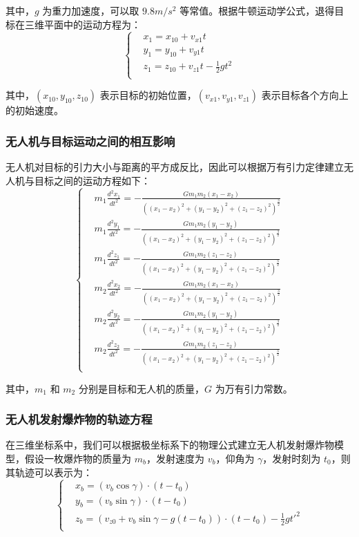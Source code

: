 \documentclass[normalsize]{ctexart}
\begin{document}
		其中，$g$ 为重力加速度，可以取 $9.8 m/s^2$ 等常值。根据牛顿运动学公式，退得目标在三维平面中的运动方程为：
		\begin{equation}
			\begin{cases}
				&x_1=x_{10}+v_{x1}t\\
				&y_1=y_{10}+v_{y1}t\\
				&z_1=z_{10}+v_{z1}t-\frac{1}{2}gt^2\\
			\end{cases}
		\end{equation}
		
		其中，$(x_{10},y_{10},z_{10})$ 表示目标的初始位置，$(v_{x1},v_{y1},v_{z1})$ 表示目标各个方向上的初始速度。
		
		\subsubsection{无人机与目标运动之间的相互影响}
		无人机对目标的引力大小与距离的平方成反比，因此可以根据万有引力定律建立无人机与目标之间的运动方程如下：
		\begin{equation}
			\begin{cases} &m_1\frac{d^2x_1}{dt^2}=-\frac{Gm_1m_2(x_1-x_2)}{((x_1-x_2)^2+(y_1-y_2)^2+(z_1-z_2)^2)^{\frac{3}{2}}}\\ &m_1\frac{d^2y_1}{dt^2}=-\frac{Gm_1m_2(y_1-y_2)}{((x_1-x_2)^2+(y_1-y_2)^2+(z_1-z_2)^2)^{\frac{3}{2}}}\\ &m_1\frac{d^2z_1}{dt^2}=-\frac{Gm_1m_2(z_1-z_2)}{((x_1-x_2)^2+(y_1-y_2)^2+(z_1-z_2)^2)^{\frac{3}{2}}}\\ &m_2\frac{d^2x_2}{dt^2}=-\frac{Gm_1m_2(x_1-x_2)}{((x_1-x_2)^2+(y_1-y_2)^2+(z_1-z_2)^2)^{\frac{3}{2}}}\\ &m_2\frac{d^2y_2}{dt^2}=-\frac{Gm_1m_2(y_1-y_2)}{((x_1-x_2)^2+(y_1-y_2)^2+(z_1-z_2)^2)^{\frac{3}{2}}}\\ &m_2\frac{d^2z_2}{dt^2}=-\frac{Gm_1m_2(z_1-z_2)}{((x_1-x_2)^2+(y_1-y_2)^2+(z_1-z_2)^2)^{\frac{3}{2}}}\\
			\end{cases}
		\end{equation}
		
		其中，$m_1$ 和 $m_2$ 分别是目标和无人机的质量，$G$ 为万有引力常数。
		
		\subsubsection{无人机发射爆炸物的轨迹方程}
		在三维坐标系中，我们可以根据极坐标系下的物理公式建立无人机发射爆炸物模型，假设一枚爆炸物的质量为 $m_b$，发射速度为 $v_b$，仰角为 $\gamma$，发射时刻为 $t_0$，则其轨迹可以表示为：
		\begin{equation}
			\begin{cases}
				&x_b=(v_b\cos\gamma)\cdot(t-t_0)\\
				&y_b=(v_b\sin\gamma)\cdot(t-t_0)\\ &z_b=(v_{z0}+v_b\sin\gamma-g(t-t_0))\cdot(t-t_0)-\frac{1}{2}gt'^2\\ \end{cases}
		\end{equation}
		
\end{document}
